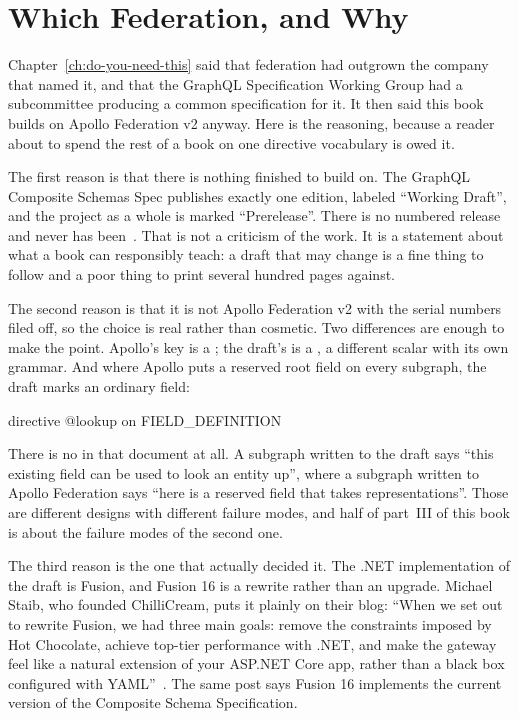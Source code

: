 \section{Which Federation, and Why}
\label{sec:ch05-which-federation-and-why}

%
Chapter~\ref{ch:do-you-need-this} said that federation had outgrown the company
that named it, and that the GraphQL Specification Working Group had a
subcommittee producing a common specification for it. It then said this book
builds on Apollo Federation v2 anyway. Here is the reasoning, because a reader
about to spend the rest of a book on one directive vocabulary is owed it.

%
The first reason is that there is nothing finished to build on. The GraphQL
Composite Schemas Spec publishes exactly one edition, labeled \enquote{Working
Draft}, and the project as a whole is marked \enquote{Prerelease}. There is no
numbered release and never has been~\autocite{compositeschemasspec}. That is not
a criticism of the work. It is a statement about what a book can responsibly
teach: a draft that may change is a fine thing to follow and a poor thing to
print several hundred pages against.

%
The second reason is that it is not Apollo Federation v2 with the serial
numbers filed off, so the choice is real rather than cosmetic. Two differences
are enough to make the point. Apollo's key is a ; the draft's is
a , a different scalar with its own grammar. And where
Apollo puts a reserved root field on every subgraph, the draft marks an ordinary
field:

\begin{graphqlsdl}
directive @lookup on FIELD_DEFINITION
\end{graphqlsdl}

%
There is no  in that document at all. A subgraph written to the
draft says \enquote{this existing field can be used to look an entity up}, where
a subgraph written to Apollo Federation says \enquote{here is a reserved field
that takes representations}. Those are different designs with different failure
modes, and half of part~III of this book is about the failure modes of the
second one.

%
The third reason is the one that actually decided it. The .NET implementation
of the draft is Fusion, and Fusion 16 is a rewrite rather than an upgrade.
Michael Staib, who founded ChilliCream, puts it plainly on their blog:
\enquote{When we set out to rewrite Fusion, we had three main goals: remove the
constraints imposed by Hot Chocolate, achieve top-tier performance with .NET,
and make the gateway feel like a natural extension of your ASP.NET Core app,
rather than a black box configured with YAML}~\autocite{staib2026fusion16}. The
same post says Fusion 16 implements the current version of the Composite Schema
Specification.

